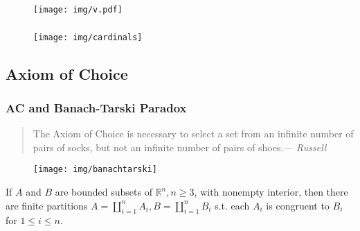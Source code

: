 \documentclass[UTF8,11pt,colorlinks,compress,openany]{beamer}%
\begin{document}
\begin{frame}\frametitle{}
	\begin{figure}
		\colorbox{green!15}{\texttt{[image: img/v.pdf]}}
	\end{figure}
\end{frame}

\begin{frame}\frametitle{}
	\begin{figure}
		\texttt{[image: img/cardinals]}
	\end{figure}
\end{frame}

\subsection{Axiom of Choice}

\begin{frame}\frametitle{AC and Banach-Tarski Paradox}
	\begin{quote}
		The Axiom of Choice is necessary to select a set from an infinite number of pairs of socks, but not an infinite number of pairs of shoes.\hfill --- \textsl{Russell}
	\end{quote}
	\begin{figure}
		\texttt{[image: img/banachtarski]}
	\end{figure}
	\begin{theorem}
		If $A$ and $B$ are bounded subsets of $\mathbb{R}^n, n\geq 3$, with nonempty interior, then there are finite partitions $A=\coprod\limits_{i=1}^n A_i, B=\coprod\limits_{i=1}^n B_i$ s.t. each $A_i$ is congruent to $B_i$ for $1\leq i\leq n$.
	\end{theorem}
\end{frame}
\end{document}
